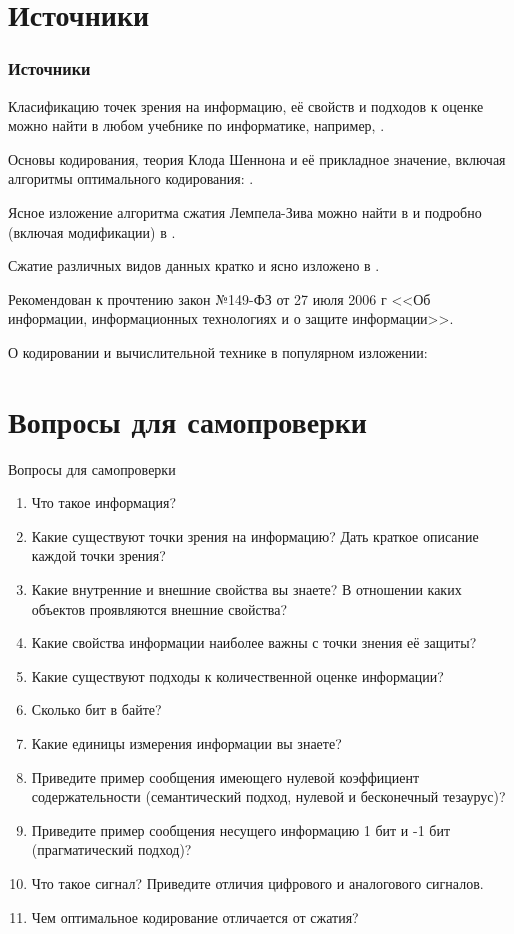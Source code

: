 \section{Источники}
\begin{frame}
    \frametitle{Источники}

    Класификацию точек зрения на информацию, её свойств и подходов к оценке можно найти в любом учебнике по информатике, например, \cite{bib:ostreykovsky:informatics}.

    Основы кодирования, теория Клода Шеннона и её прикладное значение, включая алгоритмы оптимального кодирования: \cite{bib:panin:informationTheory, bib:verner:codingBase}.

    Ясное изложение алгоритма сжатия Лемпела-Зива можно найти в \cite{bib:novic:discrmathprogrammer} и подробно (включая модификации) в \cite{bib:salmon:compressing}.

    Сжатие различных видов данных кратко и ясно изложено в \cite{bib:salmon:compressing}.

    Рекомендован к прочтению закон №149-ФЗ от 27 июля 2006 г <<Об информации, информационных технологиях и о защите информации>>.

    О кодировании и вычислительной технике в популярном изложении: \cite{bib:petsold:code}

\end{frame}


\section{Вопросы для самопроверки}
\begin{frame}[allowframebreaks]{Вопросы для самопроверки}
    \begin{enumerate}
        \item Что такое информация?
        \item Какие существуют точки зрения на информацию? Дать краткое описание каждой точки зрения?
        \item Какие внутренние и внешние свойства вы знаете? В отношении каких объектов проявляются внешние свойства?
        \item Какие свойства информации наиболее важны с точки знения её защиты?
        \item Какие существуют подходы к количественной оценке информации?
        \item Сколько бит в байте?
        \item Какие единицы измерения информации вы знаете?
        \item Приведите пример сообщения имеющего нулевой коэффициент содержательности (семантический подход, нулевой и бесконечный тезаурус)?
        \item Приведите пример сообщения несущего информацию 1 бит и -1 бит (прагматический подход)?
        \item Что такое сигнал? Приведите отличия цифрового и аналогового сигналов.
        \item Чем оптимальное кодирование отличается от сжатия?
    \end{enumerate}
\end{frame}



